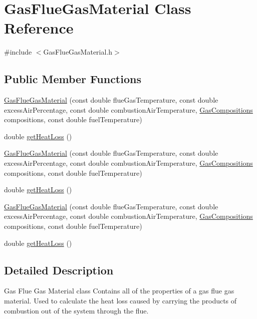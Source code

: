 \hypertarget{class_gas_flue_gas_material}{}\section{Gas\+Flue\+Gas\+Material Class Reference}
\label{class_gas_flue_gas_material}


{\ttfamily \#include $<$Gas\+Flue\+Gas\+Material.\+h$>$}

\subsection*{Public Member Functions}
\begin{DoxyCompactItemize}
\item 
\hyperlink{class_gas_flue_gas_material_aca4ce48fe0feea4e6032679652f38c98}{Gas\+Flue\+Gas\+Material} (const double flue\+Gas\+Temperature, const double excess\+Air\+Percentage, const double combustion\+Air\+Temperature, \hyperlink{class_gas_compositions}{Gas\+Compositions} compositions, const double fuel\+Temperature)
\item 
double \hyperlink{class_gas_flue_gas_material_ad9990d400536c6e8c7c53b9212de400b}{get\+Heat\+Loss} ()
\item 
\hyperlink{class_gas_flue_gas_material_aca4ce48fe0feea4e6032679652f38c98}{Gas\+Flue\+Gas\+Material} (const double flue\+Gas\+Temperature, const double excess\+Air\+Percentage, const double combustion\+Air\+Temperature, \hyperlink{class_gas_compositions}{Gas\+Compositions} compositions, const double fuel\+Temperature)
\item 
double \hyperlink{class_gas_flue_gas_material_ad9990d400536c6e8c7c53b9212de400b}{get\+Heat\+Loss} ()
\item 
\hyperlink{class_gas_flue_gas_material_aca4ce48fe0feea4e6032679652f38c98}{Gas\+Flue\+Gas\+Material} (const double flue\+Gas\+Temperature, const double excess\+Air\+Percentage, const double combustion\+Air\+Temperature, \hyperlink{class_gas_compositions}{Gas\+Compositions} compositions, const double fuel\+Temperature)
\item 
double \hyperlink{class_gas_flue_gas_material_ad9990d400536c6e8c7c53b9212de400b}{get\+Heat\+Loss} ()
\end{DoxyCompactItemize}


\subsection{Detailed Description}
Gas Flue Gas Material class Contains all of the properties of a gas flue gas material. Used to calculate the heat loss caused by carrying the products of combustion out of the system through the flue. 

